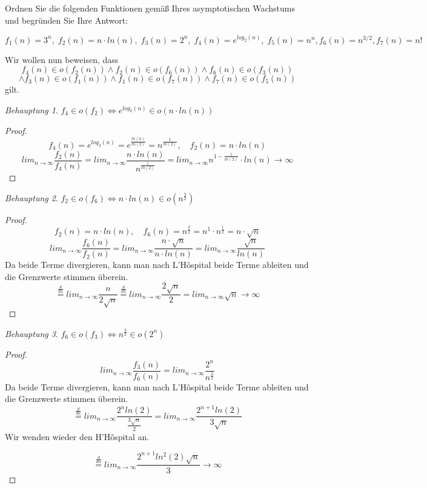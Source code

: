 \documentclass[12pt]{article}
\theoremstyle{remark}
\newtheorem*{Behauptung}{Behauptung}
\begin{document}
\section{}

Ordnen Sie die folgenden Funktionen gemäß Ihres asymptotischen Wachstums und begründen Sie Ihre Antwort:

\[
f_1(n) = 3^n, \; f_2(n) = n \cdot ln(n), \; f_3(n) = 2^n, \; f_4(n) = e^{log_2(n)}, \; f_5(n) = n^n, f_6(n) = n^{3/2}, f_7(n) = n!
\]

Wir wollen nun beweisen, dass
\[
f_4(n) \in o(f_2(n))
\land f_2(n) \in o(f_6(n))
\land f_6(n) \in o(f_3(n))
\]
\[
\land f_3(n) \in o(f_1(n))
\land f_1(n) \in o(f_7(n))
\land f_7(n) \in o(f_5(n))
\]
gilt.

\begin{Behauptung}
$f_4 \in o(f_2) \iff e^{log_2(n)} \in o(n \cdot ln(n))$
\end{Behauptung}
\begin{proof}
\[
f_4(n) = e^{log_2(n)} = e^\frac{ln(n)}{ln(2)} = n^\frac{1}{ln(2)}, \quad f_2(n) = n \cdot ln(n)
\]
\[
lim_{n\rightarrow \infty}\frac{f_2(n)}{f_4(n)}
= lim_{n\rightarrow \infty}\frac{n \cdot ln(n)}{n^\frac{1}{ln(2)}}
= lim_{n\rightarrow \infty}n^{1-\frac{1}{ln(2)}} \cdot ln(n) \rightarrow \infty
\]
\end{proof}

\begin{Behauptung}
$f_2 \in o(f_6) \iff n \cdot ln(n) \in o(n^\frac{3}{2})$
\end{Behauptung}
\begin{proof}
\[
f_2(n) = n \cdot ln(n), \quad f_6(n) = n^\frac{3}{2} = n^1 \cdot n^\frac{1}{2} = n \cdot \sqrt{n}
\]
\[
lim_{n\rightarrow \infty}\frac{f_6(n)}{f_2(n)}
= lim_{n\rightarrow \infty}\frac{n \cdot \sqrt{n}}{n \cdot ln(n)}
= lim_{n\rightarrow \infty}\frac{\sqrt{n}}{ln(n)}
\]
Da beide Terme divergieren, kann man nach L'Hôspital beide Terme ableiten und die Grenzwerte stimmen überein.
\[
\stackrel{\frac{d}{dn}}{=} lim_{n\rightarrow \infty}\frac{n}{2\sqrt{n}}
\stackrel{\frac{d}{dn}}{=} lim_{n\rightarrow \infty}\frac{2\sqrt{n}}{2}
= lim_{n\rightarrow \infty}\sqrt{n}
\rightarrow \infty
\]

\end{proof}

\begin{Behauptung}
$f_6 \in o(f_3) \iff n^\frac{3}{2} \in o(2^n)$
\end{Behauptung}
\begin{proof}
\[
lim_{n\rightarrow \infty}\frac{f_3(n)}{f_6(n)}
= lim_{n\rightarrow \infty}\frac{2^n}{n^\frac{3}{2}}
\]
Da beide Terme divergieren, kann man nach L'Hôspital beide Terme ableiten und die Grenzwerte stimmen überein.
\[
\stackrel{\frac{d}{dn}}{=} lim_{n\rightarrow \infty}\frac{2^nln(2)}{\frac{3\sqrt{n}}{2}}
= lim_{n\rightarrow \infty}\frac{2^{n+1} ln(2)}{3\sqrt{n}}
\]
Wir wenden wieder den H'Hôspital an.

\[
\stackrel{\frac{d}{dn}}{=} lim_{n\rightarrow \infty}\frac{2^{n+1} ln^2(2) \sqrt{n}}{3}
\rightarrow \infty
\]
\end{proof}
\end{document}
